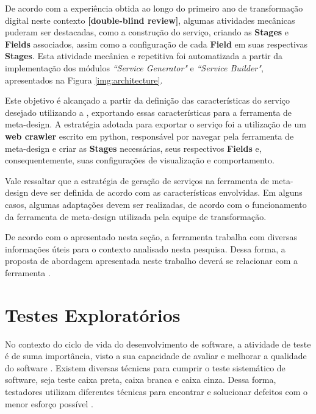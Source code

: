 De acordo com a experiência obtida ao longo do primeiro ano de transformação digital neste contexto \textbf{[double-blind review]}, algumas atividades mecânicas puderam ser destacadas, como a construção do serviço, criando as \textbf{Stages} e \textbf{Fields} associados, assim como a configuração de cada \textbf{Field} em suas respectivas \textbf{Stages}. Esta atividade mecânica e repetitiva foi automatizada a partir da implementação dos módulos \textit{``Service Generator"} e \textit{``Service Builder"}, apresentados na Figura \ref{img:architecture}.

Este objetivo é alcançado a partir da definição das características do serviço desejado utilizando a \itractool, exportando essas características para a ferramenta de meta-design. A estratégia adotada para exportar o serviço foi a utilização de um \textbf{web crawler} escrito em python, responsável por navegar pela ferramenta de meta-design e criar as \textbf{Stages} necessárias, seus respectivos \textbf{Fields} e, consequentemente, suas configurações de visualização e comportamento.

Vale ressaltar que a estratégia de geração de serviços na ferramenta de meta-design deve ser definida de acordo com as características envolvidas. Em alguns casos, algumas adaptações devem ser realizadas, de acordo com o funcionamento da ferramenta de meta-design utilizada pela equipe de transformação.


De acordo com o apresentado nesta seção, a ferramenta \itractool trabalha com diversas informações úteis para o contexto analisado nesta pesquisa. Dessa forma, a proposta de abordagem apresentada neste trabalho deverá se relacionar com a ferramenta \itractool.

\section{Testes Exploratórios}
\label{sec:testes_exploratorios}

 No contexto do ciclo de vida do desenvolvimento de software, a atividade de teste é de suma importância, visto a sua capacidade de avaliar e melhorar a qualidade do software \cite{bertolino2007software}. Existem diversas técnicas para cumprir o teste sistemático de software, seja teste caixa preta, caixa branca e caixa cinza. Dessa forma, testadores utilizam diferentes técnicas para encontrar e solucionar defeitos com o menor esforço possível \cite{maldonado2004introduccao}. 

